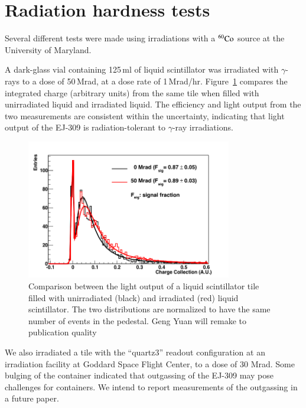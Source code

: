 \documentclass[review]{elsarticle}
\begin{document}
\section{Radiation hardness tests}

Several different tests were made using irradiations with a
$\rm{^{60}Co}$ source at the University of Maryland.

A dark-glass vial containing 125\,ml
of liquid scintillator was irradiated with $\gamma$-rays to a
dose of 50\,Mrad, at a dose rate of 1\,Mrad/hr.
Figure~\ref{fig:ej309_irradiated} compares the integrated charge (arbitrary units)
from the same tile when filled with unirradiated liquid and irradiated liquid.
The efficiency and light output from the two measurements are
consistent within the uncertainty, indicating that light output of the EJ-309 is
radiation-tolerant to $\gamma$-ray irradiations.

\begin{figure}[!ht]
\begin{center}
\includegraphics[width=0.8\textwidth]{./figures/RD_R7600_1_0_DBF_ALM_GRS_TH450_100814_all_1.png}
\caption{Comparison between the light output of a liquid scintillator
  tile filled with unirradiated (black) and irradiated (red) liquid
  scintillator. The two distributions are normalized to have the same
  number of events in the pedestal.{\color{red} Geng Yuan will remake to publication quality}}
\label{fig:ej309_irradiated}
\end{center}
\end{figure}

We also irradiated a tile with the ``quartz3'' readout configuration
at an irradiation facility at Goddard Space Flight Center, to a dose of 30 Mrad.
Some bulging of the container indicated that outgassing of the EJ-309 
may pose challenges for containers.  We intend to report measurements of the outgassing in a future paper.
\end{document}
